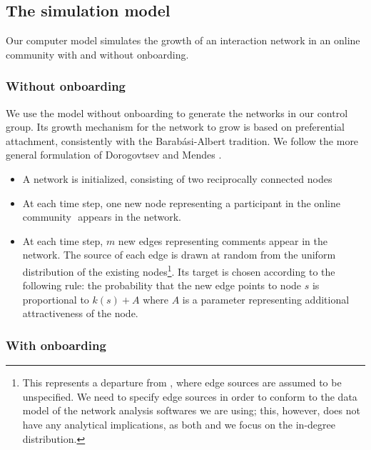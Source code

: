 \subsection{The simulation model}

Our computer model simulates the growth of an interaction network in an online community with and without onboarding.  

\subsubsection*{Without onboarding}

We use the model without onboarding to generate the networks in our control group. Its growth mechanism for the network to grow is based on preferential attachment, consistently with the Barabási-Albert tradition. We follow the more general formulation of Dorogovtsev and Mendes \cite{dorogovtsev2002evolution}.
\begin{itemize}
\item A network is initialized, consisting of two reciprocally connected nodes
\item At each time step, one new node \textendash   representing a participant in the online community \textendash  appears in the network. 
\item At each time step, $m$ new edges \textendash   representing comments \textendash   appear in the network. The source of each edge is drawn at random from the uniform distribution of the existing nodes\footnote{This represents a departure from \cite{dorogovtsev2002evolution}, where edge sources are assumed to be unspecified. We need to specify edge sources in order to conform to the data model of the network analysis softwares we are using; this, however, does not have any analytical implications, as both \cite{dorogovtsev2002evolution} and we focus on the in-degree distribution.}. Its target is chosen according to the following rule: the probability that the new edge points to node $s$ is proportional to $k(s) + A$ where $A$ is a parameter representing additional attractiveness of the node.
\end{itemize}

\subsubsection*{With onboarding}

